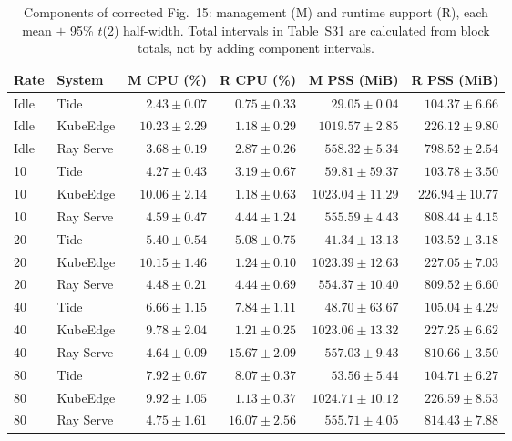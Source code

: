 \begin{table}[htbp]\centering\small
\caption{Components of corrected Fig.~15: management (M) and runtime support (R), each mean $\pm$ 95\% $t$(2) half-width. Total intervals in Table~S31 are calculated from block totals, not by adding component intervals.}
\label{tab:fig14-role-components}
\setlength{\tabcolsep}{3pt}
\begin{tabular*}{\linewidth}{@{\extracolsep{\fill}}llrrrr}
\toprule Rate & System & M CPU (\%) & R CPU (\%) & M PSS (MiB) & R PSS (MiB)\\\midrule
Idle & Tide & $2.43 \pm 0.07$ & $0.75 \pm 0.33$ & $29.05 \pm 0.04$ & $104.37 \pm 6.66$\\
Idle & KubeEdge & $10.23 \pm 2.29$ & $1.18 \pm 0.29$ & $1019.57 \pm 2.85$ & $226.12 \pm 9.80$\\
Idle & Ray Serve & $3.68 \pm 0.19$ & $2.87 \pm 0.26$ & $558.32 \pm 5.34$ & $798.52 \pm 2.54$\\
10 & Tide & $4.27 \pm 0.43$ & $3.19 \pm 0.67$ & $59.81 \pm 59.37$ & $103.78 \pm 3.50$\\
10 & KubeEdge & $10.06 \pm 2.14$ & $1.18 \pm 0.63$ & $1023.04 \pm 11.29$ & $226.94 \pm 10.77$\\
10 & Ray Serve & $4.59 \pm 0.47$ & $4.44 \pm 1.24$ & $555.59 \pm 4.43$ & $808.44 \pm 4.15$\\
20 & Tide & $5.40 \pm 0.54$ & $5.08 \pm 0.75$ & $41.34 \pm 13.13$ & $103.52 \pm 3.18$\\
20 & KubeEdge & $10.15 \pm 1.46$ & $1.24 \pm 0.10$ & $1023.39 \pm 12.63$ & $227.05 \pm 7.03$\\
20 & Ray Serve & $4.48 \pm 0.21$ & $4.44 \pm 0.69$ & $554.37 \pm 10.40$ & $809.52 \pm 6.60$\\
40 & Tide & $6.66 \pm 1.15$ & $7.84 \pm 1.11$ & $48.70 \pm 63.67$ & $105.04 \pm 4.29$\\
40 & KubeEdge & $9.78 \pm 2.04$ & $1.21 \pm 0.25$ & $1023.06 \pm 13.32$ & $227.25 \pm 6.62$\\
40 & Ray Serve & $4.64 \pm 0.09$ & $15.67 \pm 2.09$ & $557.03 \pm 9.43$ & $810.66 \pm 3.50$\\
80 & Tide & $7.92 \pm 0.67$ & $8.07 \pm 0.37$ & $53.56 \pm 5.44$ & $104.71 \pm 6.27$\\
80 & KubeEdge & $9.92 \pm 1.05$ & $1.13 \pm 0.37$ & $1024.71 \pm 10.12$ & $226.59 \pm 8.53$\\
80 & Ray Serve & $4.75 \pm 1.61$ & $16.07 \pm 2.56$ & $555.71 \pm 4.05$ & $814.43 \pm 7.88$\\
\bottomrule\end{tabular*}\end{table}

